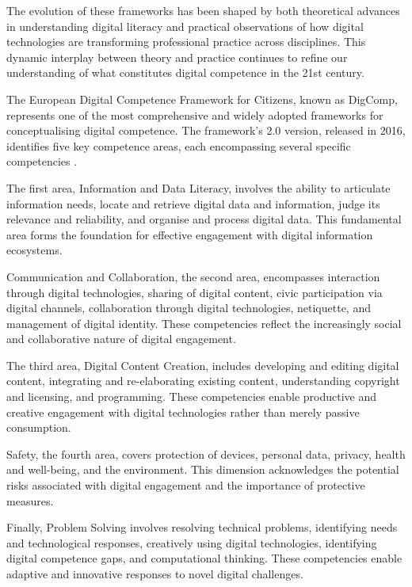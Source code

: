 \documentclass[cte]{acnsart}
\begin{document}
The evolution of these frameworks has been shaped by both theoretical advances in understanding digital literacy and practical observations of how digital technologies are transforming professional practice across disciplines. This dynamic interplay between theory and practice continues to refine our understanding of what constitutes digital competence in the 21st century.


The European Digital Competence Framework for Citizens, known as DigComp, represents one of the most comprehensive and widely adopted frameworks for conceptualising digital competence. The framework's 2.0 version, released in 2016, identifies five key competence areas, each encompassing several specific competencies \cite{Vuorikari2016}.

The first area, Information and Data Literacy, involves the ability to articulate information needs, locate and retrieve digital data and information, judge its relevance and reliability, and organise and process digital data. This fundamental area forms the foundation for effective engagement with digital information ecosystems.

Communication and Collaboration, the second area, encompasses interaction through digital technologies, sharing of digital content, civic participation via digital channels, collaboration through digital technologies, netiquette, and management of digital identity. These competencies reflect the increasingly social and collaborative nature of digital engagement.

The third area, Digital Content Creation, includes developing and editing digital content, integrating and re-elaborating existing content, understanding copyright and licensing, and programming. These competencies enable productive and creative engagement with digital technologies rather than merely passive consumption.

Safety, the fourth area, covers protection of devices, personal data, privacy, health and well-being, and the environment. This dimension acknowledges the potential risks associated with digital engagement and the importance of protective measures.

Finally, Problem Solving involves resolving technical problems, identifying needs and technological responses, creatively using digital technologies, identifying digital competence gaps, and computational thinking. These competencies enable adaptive and innovative responses to novel digital challenges.
\end{document}
